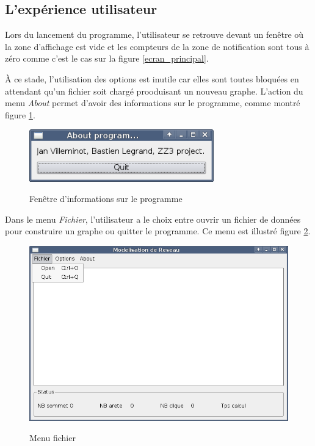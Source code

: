 \subsection{L'exp\'erience utilisateur}
\par
Lors du lancement du programme, l'utilisateur se retrouve devant un fen\^etre o\`u la zone d'affichage est vide et les compteurs de la zone de notification sont tous \`a z\'ero comme c'est le cas sur la figure \ref{ecran_principal}.
\par
\`A ce stade, l'utilisation des options est inutile car elles sont toutes bloqu\'ees en attendant qu'un fichier soit charg\'e prooduisant un nouveau graphe. L'action du menu \textit{About} permet d'avoir des informations sur le programme, comme montr\'e figure \ref{ecran_about}.

\begin{figure}[H]
\centering
 \fbox
 {
 \includegraphics[width=8cm]{./schema/capture_ecran_about.png}
 }
  \caption{\label{ecran_about}Fen\^etre d'informations sur le programme}
\end{figure}

\par
Dans le menu \textit{Fichier}, l'utilisateur a le choix entre ouvrir un fichier de donn\'ees pour construire un graphe ou quitter le programme. Ce menu est illustr\'e figure \ref{ecran_fichier}.

\begin{figure}[H]
\centering
 \fbox
 {
 \includegraphics[width=12cm]{./schema/capture_ecran_fichier.png}
 }
  \caption{\label{ecran_fichier}Menu fichier}
\end{figure}

